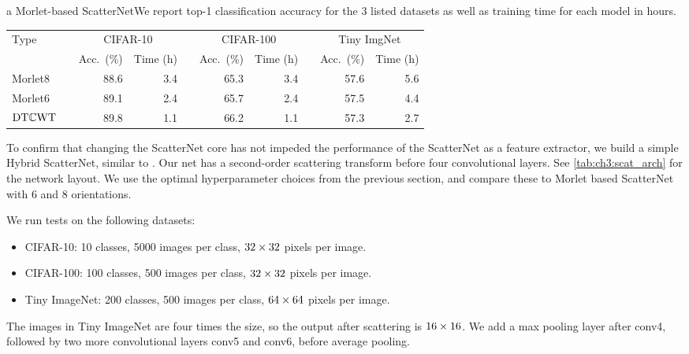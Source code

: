 \begin{table}[ht]
{  a Morlet-based ScatterNet}{We report top-1 classification accuracy for the 3
  listed datasets as well as training time for each model in hours.}
  \label{tab:ch3:comparison}
  \begin{tabular}{lcrrcrrcrr}
    \toprule
    Type & \phantom{abc} & \multicolumn{2}{c}{CIFAR-10} && \multicolumn{2}{c}{CIFAR-100}
         && \multicolumn{2}{c}{Tiny ImgNet} \\\cmidrule{3-4}\cmidrule{6-7}\cmidrule{9-10}
         && Acc.\ (\%) & Time (h) && Acc.\ (\%) & Time (h) && Acc.\ (\%) & Time (h)\\\midrule
    Morlet8 && 88.6 & 3.4 && 65.3 & 3.4 && 57.6 & 5.6 \\
    Morlet6 && 89.1 & 2.4 && 65.7 & 2.4 && 57.5 & 4.4 \\
    $\mathrm{DT}\mathbb{C}\mathrm{WT}$ && 89.8 & 1.1 && 66.2 & 1.1 && 57.3 & 2.7 \\\bottomrule
  \end{tabular}
\end{table}
To confirm that changing the ScatterNet core has not impeded the
performance of the ScatterNet as a feature extractor, we build a simple Hybrid
ScatterNet, similar to \cite{oyallon_scaling_2017}. Our net 
has a second-order scattering transform before four convolutional layers. See \autoref{tab:ch3:scat_arch}
for the network layout.
We use the optimal hyperparameter choices from the previous section, and compare
these to Morlet based ScatterNet with 6 and 8 orientations.

We run tests on the following datasets:
\begin{itemize}
  \item CIFAR-10: 10 classes, 5000 images per class, $32\times 32$ pixels per image.
  \item CIFAR-100: 100 classes, 500 images per class, $32\times 32$ pixels per image.
  \item Tiny ImageNet\cite{li_tiny_2017}: 200 classes, 500 images per class,
    $64 \times 64$ pixels per image.
\end{itemize}

The images in Tiny ImageNet are four times the size, so the output after
scattering is $16\times 16$. We add a max pooling layer after conv4, followed
by two more convolutional layers conv5 and conv6, before average pooling.

